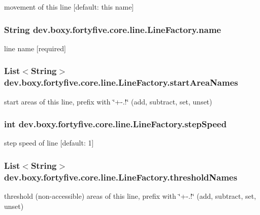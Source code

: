 \label{db/df8/group__lines_ga4b63112d92793b6d05a8a2c2a847ebd0}
movement of this line \mbox{[}default: this name\mbox{]} \hypertarget{group__lines_ga9ed595e6ac26025b9e2826cc195327c1}{
\subsubsection[{name}]{\setlength{\rightskip}{0pt plus 5cm}String {\bf dev.boxy.fortyfive.core.line.LineFactory.name}}}
\label{db/df8/group__lines_ga9ed595e6ac26025b9e2826cc195327c1}
line name \mbox{[}required\mbox{]} \hypertarget{group__lines_gaaef9f97a8fb5932bba9333942aba8e6a}{
\subsubsection[{startAreaNames}]{\setlength{\rightskip}{0pt plus 5cm}List$<$String$>$ {\bf dev.boxy.fortyfive.core.line.LineFactory.startAreaNames}}}
\label{db/df8/group__lines_gaaef9f97a8fb5932bba9333942aba8e6a}
start areas of this line, prefix with \char`\"{}+-\/.!\char`\"{} (add, subtract, set, unset) \hypertarget{group__lines_gab7c2eccacb6d52fab1529bbec2d2c314}{
\subsubsection[{stepSpeed}]{\setlength{\rightskip}{0pt plus 5cm}int {\bf dev.boxy.fortyfive.core.line.LineFactory.stepSpeed}}}
\label{db/df8/group__lines_gab7c2eccacb6d52fab1529bbec2d2c314}
step speed of line \mbox{[}default: 1\mbox{]} \hypertarget{group__lines_ga9599963728730f344f357a1c9e104551}{
\subsubsection[{thresholdNames}]{\setlength{\rightskip}{0pt plus 5cm}List$<$String$>$ {\bf dev.boxy.fortyfive.core.line.LineFactory.thresholdNames}}}
\label{db/df8/group__lines_ga9599963728730f344f357a1c9e104551}
threshold (non-\/accessible) areas of this line, prefix with \char`\"{}+-\/.!\char`\"{} (add, subtract, set, unset) 